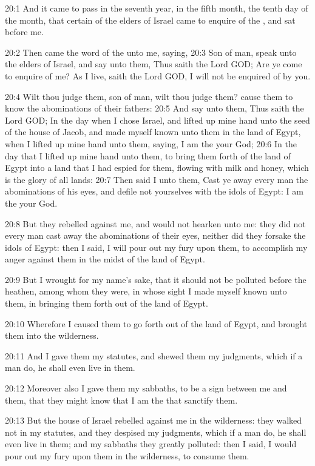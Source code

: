 20:1 And it came to pass in the seventh year, in the fifth month, the tenth day of the month, that certain of the elders of Israel came to enquire of the \LORD, and sat before me.

20:2 Then came the word of the \LORD unto me, saying, 20:3 Son of man, speak unto the elders of Israel, and say unto them, Thus saith the Lord GOD; Are ye come to enquire of me? As I live, saith the Lord GOD, I will not be enquired of by you.

20:4 Wilt thou judge them, son of man, wilt thou judge them? cause them to know the abominations of their fathers: 20:5 And say unto them, Thus saith the Lord GOD; In the day when I chose Israel, and lifted up mine hand unto the seed of the house of Jacob, and made myself known unto them in the land of Egypt, when I lifted up mine hand unto them, saying, I am the \LORD your God; 20:6 In the day that I lifted up mine hand unto them, to bring them forth of the land of Egypt into a land that I had espied for them, flowing with milk and honey, which is the glory of all lands: 20:7 Then said I unto them, Cast ye away every man the abominations of his eyes, and defile not yourselves with the idols of Egypt: I am the \LORD your God.

20:8 But they rebelled against me, and would not hearken unto me: they did not every man cast away the abominations of their eyes, neither did they forsake the idols of Egypt: then I said, I will pour out my fury upon them, to accomplish my anger against them in the midst of the land of Egypt.

20:9 But I wrought for my name's sake, that it should not be polluted before the heathen, among whom they were, in whose sight I made myself known unto them, in bringing them forth out of the land of Egypt.

20:10 Wherefore I caused them to go forth out of the land of Egypt, and brought them into the wilderness.

20:11 And I gave them my statutes, and shewed them my judgments, which if a man do, he shall even live in them.

20:12 Moreover also I gave them my sabbaths, to be a sign between me and them, that they might know that I am the \LORD that sanctify them.

20:13 But the house of Israel rebelled against me in the wilderness: they walked not in my statutes, and they despised my judgments, which if a man do, he shall even live in them; and my sabbaths they greatly polluted: then I said, I would pour out my fury upon them in the wilderness, to consume them.

